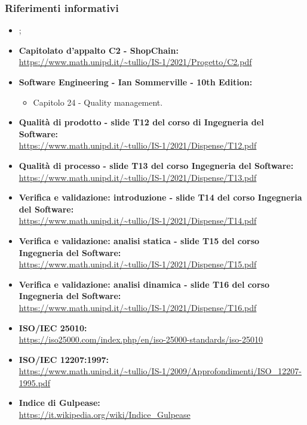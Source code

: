 \subsubsection{Riferimenti informativi}\label{subsubsection:riferimenti_informativi}
\begin{itemize}
  \item \textbf{\docNameVersionAdR{}};
  \item \textbf{Capitolato d'appalto C2 - ShopChain:}\\\url{https://www.math.unipd.it/~tullio/IS-1/2021/Progetto/C2.pdf}
  \item \textbf{Software Engineering - Ian Sommerville - 10th Edition:}
  \begin{itemize}
    \item Capitolo 24 - Quality management.
  \end{itemize}
  \item \textbf{Qualità di prodotto - slide T12 del corso di Ingegneria del Software:}\\\url{https://www.math.unipd.it/~tullio/IS-1/2021/Dispense/T12.pdf}
  \item \textbf{Qualità di processo - slide T13 del corso Ingegneria del Software:}\\\url{https://www.math.unipd.it/~tullio/IS-1/2021/Dispense/T13.pdf}
  \item \textbf{Verifica e validazione: introduzione - slide T14 del corso Ingegneria del Software:}\\\url{https://www.math.unipd.it/~tullio/IS-1/2021/Dispense/T14.pdf}
  \item \textbf{Verifica e validazione: analisi statica - slide T15 del corso Ingegneria del Software:}\\\url{https://www.math.unipd.it/~tullio/IS-1/2021/Dispense/T15.pdf}
  \item \textbf{Verifica e validazione: analisi dinamica - slide T16 del corso Ingegneria del Software:}\\\url{https://www.math.unipd.it/~tullio/IS-1/2021/Dispense/T16.pdf}
  \item \textbf{ISO/IEC 25010:}\\\url{https://iso25000.com/index.php/en/iso-25000-standards/iso-25010}
  \item \textbf{ISO/IEC 12207:1997:}\\\url{https://www.math.unipd.it/~tullio/IS-1/2009/Approfondimenti/ISO_12207-1995.pdf}
  \item \textbf{Indice di Gulpease:}\\\url{https://it.wikipedia.org/wiki/Indice_Gulpease}
\end{itemize}